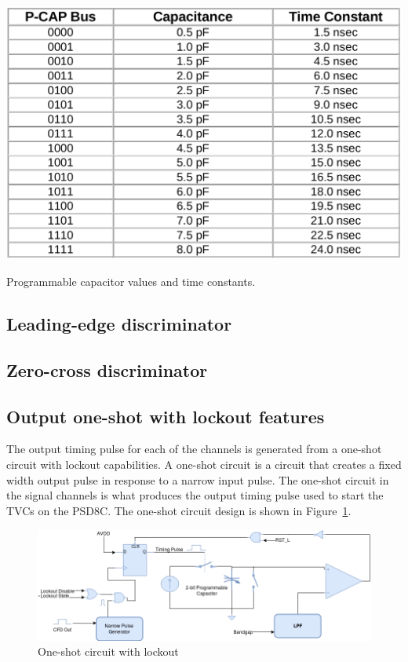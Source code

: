 \documentclass[12pt,oneside,final]{siuethesis}
\theoremstyle{definition}
\begin{document}
\begin{table}[htbp!]
 \centering
 \includegraphics[scale=.25,keepaspectratio=true]{../data/pcap.png}
 \caption{Programmable capacitor values and time constants.}
 \label{tab:pcap}
\end{table}

\subsection{Leading-edge discriminator}

\subsection{Zero-cross discriminator}


\subsection{Output one-shot with lockout features}
\par The output timing pulse for each of the channels is generated from a one-shot circuit with lockout capabilities. A one-shot circuit is a circuit that creates a fixed width output pulse in response to a narrow input pulse. The one-shot circuit in the signal channels is what produces the output timing pulse used to start the TVCs on the PSD8C. The one-shot circuit design is shown in Figure~\ref{fig:oneshot-circuit}.

\begin{figure}[htbp!]
\centering
\includegraphics[scale=.53,keepaspectratio=true]{./ch3_figures/oneshot_circuit.png} 
\caption{One-shot circuit with lockout}
\label{fig:oneshot-circuit}
\end{figure}
\end{document}
